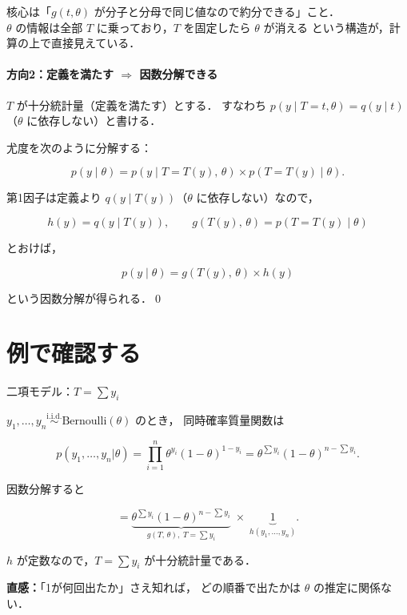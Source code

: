 \documentclass[lualatex,ja=standard,a4paper,12pt]{bxjsarticle}
\begin{document}
\begin{pointbox}
核心は「$g(t,\theta)$ が分子と分母で同じ値なので約分できる」こと．\\
$\theta$ の情報は全部 $T$ に乗っており，$T$ を固定したら $\theta$ が消える
という構造が，計算の上で直接見えている．
\end{pointbox}

\paragraph{方向2：定義を満たす $\Rightarrow$ 因数分解できる}

$T$ が十分統計量（定義を満たす）とする．
すなわち $p(y \mid T=t, \theta) = q(y \mid t)$（$\theta$ に依存しない）と書ける．

尤度を次のように分解する：

\[
  p(y \mid \theta)
  = p(y \mid T=T(y),\, \theta) \times p(T=T(y) \mid \theta).
\]

第1因子は定義より $q(y \mid T(y))$（$\theta$ に依存しない）なので，

\[
  h(y) = q(y \mid T(y)),
  \qquad
  g(T(y),\, \theta) = p(T=T(y) \mid \theta)
\]

とおけば，

\[
  p(y \mid \theta) = g(T(y),\, \theta) \times h(y)
\]

という因数分解が得られる．\qed

\section{例で確認する}

\begin{exbox}{二項モデル：$T = \sum y_i$}

$y_1,\ldots,y_n \overset{\text{i.i.d.}}{\sim} \mathrm{Bernoulli}(\theta)$ のとき，
同時確率質量関数は

\[
  p(y_1,\ldots,y_n|\theta)
  = \prod_{i=1}^n \theta^{y_i}(1-\theta)^{1-y_i}
  = \theta^{\sum y_i}(1-\theta)^{n - \sum y_i}.
\]

因数分解すると

\[
  = \underbrace{\theta^{\sum y_i}(1-\theta)^{n-\sum y_i}}_{g(T,\,\theta),\; T=\sum y_i}
  \;\times\;
  \underbrace{1}_{h(y_1,\ldots,y_n)}.
\]

$h$ が定数なので，$T = \sum y_i$ が十分統計量である．

\medskip
\noindent\textbf{直感：}「1が何回出たか」さえ知れば，
どの順番で出たかは $\theta$ の推定に関係ない．
\end{exbox}
\end{document}

